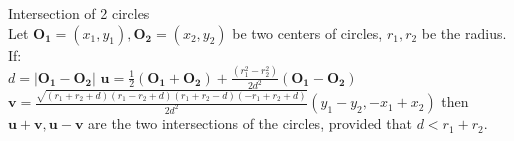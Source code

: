 Intersection of 2 circles\\
Let $\mathbf{O_1} = (x_1, y_1), \mathbf{O_2} = (x_2, y_2)$ be two centers of circles,  $r_1,r_2$ be the radius. If:\\
$ d = | \mathbf{O_1} - \mathbf{O_2} | $
$ \mathbf{u} = \frac{ 1 }{ 2 } ( \mathbf{O_1} + \mathbf{O_2} )+ 
\frac{ ( r_1^2 - r_2^2 )  }
{ 2 d^2 } ( \mathbf{O_1} - \mathbf{O_2} )$ \\
$ \mathbf{v} = \frac{ \sqrt{(r_1+r_2+d) (r_1-r_2+d) (r_1+r_2-d) (-r_1+r_2+d)} }{ 2 d^2 } ( y_1 - y_2 , -x_1 + x_2 )$
then $ \mathbf{u} + \mathbf{v} , \mathbf{u} - \mathbf{v} $
are the two intersections of the circles, provided that $ d < r_1 + r_2 $.

